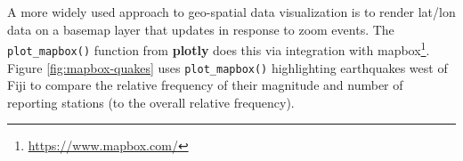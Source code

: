\documentclass[
  12pt,
]{krantz}
\renewcommand{\href}[2]{#2\footnote{\url{#1}}}
\begin{document}
A more widely used approach to geo-spatial data visualization is to render lat/lon data on a basemap layer that updates in response to zoom events. The \texttt{plot\_mapbox()} function from \textbf{plotly} does this via integration with \href{https://www.mapbox.com/}{mapbox}. Figure \ref{fig:mapbox-quakes} uses \texttt{plot\_mapbox()} highlighting earthquakes west of Fiji to compare the relative frequency of their magnitude and number of reporting stations (to the overall relative frequency).

\end{document}
